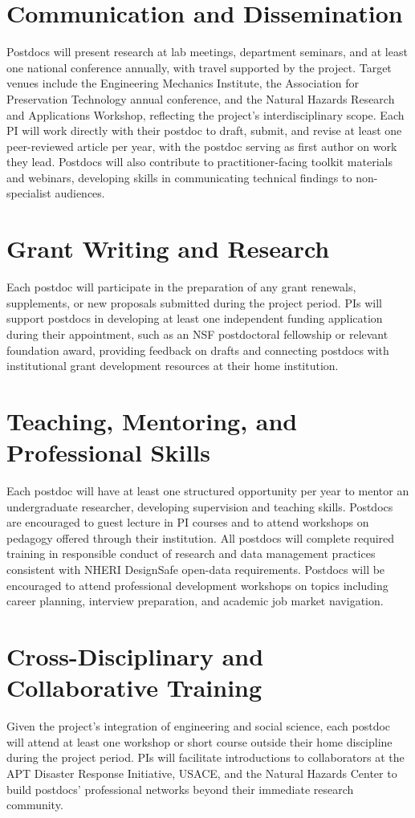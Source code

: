 \documentclass[11pt]{article}
\begin{document}
\section*{Communication and Dissemination} Postdocs will present research at lab meetings, department seminars, and at
least one national conference annually, with travel supported by the project.
Target venues include the Engineering Mechanics Institute, the Association
for Preservation Technology annual conference, and the Natural Hazards
Research and Applications Workshop, reflecting the project's interdisciplinary
scope. Each PI will work directly with their postdoc to draft, submit, and
revise at least one peer-reviewed article per year, with the postdoc serving
as first author on work they lead. Postdocs will also contribute to
practitioner-facing toolkit materials and webinars, developing skills in
communicating technical findings to non-specialist audiences.
\vspace{-0.5cm}
\section*{Grant Writing and Research} Each postdoc will participate in the preparation of any grant renewals,
supplements, or new proposals submitted during the project period. PIs will
support postdocs in developing at least one independent funding application
during their appointment, such as an NSF postdoctoral fellowship or
relevant foundation award, providing feedback on drafts and connecting
postdocs with institutional grant development resources at their home
institution.
\vspace{-0.5cm}
\section*{Teaching, Mentoring, and Professional Skills} Each postdoc will have at least one structured opportunity per year to
mentor an undergraduate researcher, developing supervision and teaching
skills. Postdocs are encouraged to guest lecture in PI courses and to
attend workshops on pedagogy offered through their institution. All postdocs
will complete required training in responsible conduct of research and data
management practices consistent with NHERI DesignSafe open-data requirements.
Postdocs will be encouraged to attend professional development workshops on
topics including career planning, interview preparation, and academic job
market navigation.
\vspace{-0.5cm}
\section*{Cross-Disciplinary and Collaborative Training} Given the project's integration of engineering and social science, each
postdoc will attend at least one workshop or short course outside their home
discipline during the project period. PIs will facilitate introductions to
collaborators at the APT Disaster Response Initiative, USACE, and the Natural
Hazards Center to build postdocs' professional networks beyond their immediate
research community.
\vspace{-0.5cm}
\end{document}
